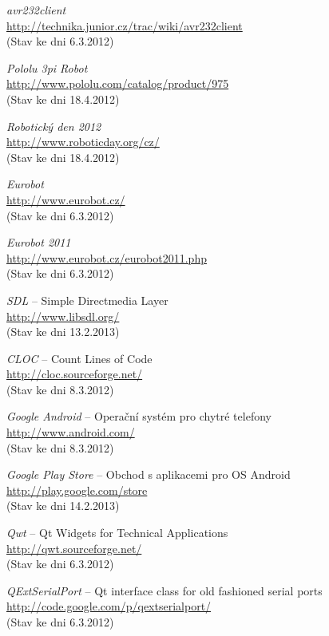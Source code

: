 \documentclass[12pt, a4paper, oneside]{article}
\newcommand{\It}{\textit}  %
\begin{document}
\begin{thebibliography}{99}
     \It{avr232client} \\
    \url{http://technika.junior.cz/trac/wiki/avr232client}\\
    (Stav ke dni 6.3.2012)

     \It{Pololu 3pi Robot} \\
    \url{http://www.pololu.com/catalog/product/975}\\
    (Stav ke dni 18.4.2012)

     \It{Robotický den 2012} \\
    \url{http://www.roboticday.org/cz/}\\
    (Stav ke dni 18.4.2012)

     \It{Eurobot} \\
    \url{http://www.eurobot.cz/}\\
    (Stav ke dni 6.3.2012)

     \It{Eurobot 2011} \\
    \url{http://www.eurobot.cz/eurobot2011.php}\\
    (Stav ke dni 6.3.2012)

     \It{SDL} -- Simple Directmedia Layer \\
    \url{http://www.libsdl.org/}\\
    (Stav ke dni 13.2.2013)

     \It{CLOC} -- Count Lines of Code \\
    \url{http://cloc.sourceforge.net/}\\
    (Stav ke dni 8.3.2012)

     \It{Google Android} -- Operační systém pro chytré telefony\\
    \url{http://www.android.com/}\\
    (Stav ke dni 8.3.2012)

     \It{Google Play Store} -- Obchod s aplikacemi pro OS Android\\
    \url{http://play.google.com/store}\\
    (Stav ke dni 14.2.2013)

     \It{Qwt} -- Qt Widgets for Technical Applications \\
    \url{http://qwt.sourceforge.net/}\\
    (Stav ke dni 6.3.2012)

     \It{QExtSerialPort} -- Qt interface class for old fashioned serial ports \\
    \url{http://code.google.com/p/qextserialport/}\\
    (Stav ke dni 6.3.2012)


\end{thebibliography}
\end{document}
